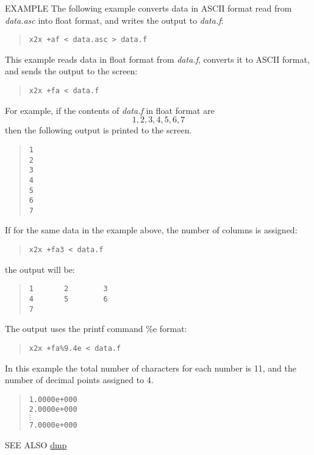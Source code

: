 \begin{qsection}{EXAMPLE}
The following example converts data in ASCII format
read from {\em data.asc} into float format,
and writes the output to {\em data.f}:
\begin{quote}
  \verb!x2x +af < data.asc > data.f!
\end{quote}
\par
This example reads data in float format from {\em data.f},
converts it to ASCII format, and sends the output to the screen:
\begin{quote}
  \verb!x2x +fa < data.f!
\end{quote}
For example, if the contents of {\em data.f} in float format are
\begin{displaymath}
  1, 2, 3, 4, 5, 6, 7
\end{displaymath}
then the following output is printed to the screen.
\begin{quote}
  \verb!1! \\
  \verb!2! \\
  \verb!3! \\
  \verb!4! \\
  \verb!5! \\
  \verb!6! \\
  \verb!7!
\end{quote}
\par
If for the same data in the example above,
the number of columns is assigned:
\begin{quote}
  \verb!x2x +fa3 < data.f!
\end{quote}
the output will be:
\begin{quote}
  \verb!1       2        3! \\
  \verb!4       5        6! \\
  \verb!7!
\end{quote}
\par
The output uses the printf command \%e format:
\begin{quote}
  \verb!x2x +fa%9.4e < data.f!
\end{quote}
In this example the total number of characters for each number
is 11, and the number of decimal points assigned to 4.
\begin{quote}
  \verb!1.0000e+000! \\
  \verb!2.0000e+000! \\
  \mbox{\hspace{2em}}$\vdots$ \\
  \verb!7.0000e+000!
\end{quote}
\end{qsection}

\begin{qsection}{SEE ALSO}
\hyperlink{dmp}{dmp}
\end{qsection}

